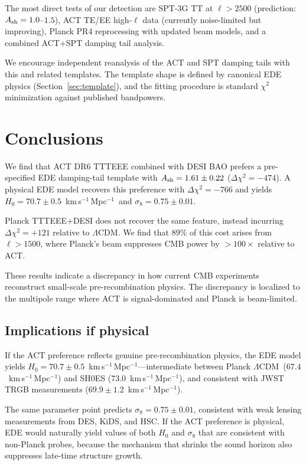 \documentclass[onecolumn,showpacs,preprintnumbers,amsmath,amssymb,prd]{revtex4-2}
\newcommand{\lcdm}{$\Lambda$CDM}
\newcommand{\kms}{km\,s$^{-1}$\,Mpc$^{-1}$}
\begin{document}
The most direct tests of our detection are SPT-3G TT at $\ell > 2500$ (prediction: $A_{\rm sh} = 1.0$--$1.5$), ACT TE/EE high-$\ell$ data (currently noise-limited but improving), Planck PR4 reprocessing with updated beam models, and a combined ACT+SPT damping tail analysis.

We encourage independent reanalysis of the ACT and SPT damping tails 
with this and related templates. The template shape is defined by 
canonical EDE physics (Section~\ref{sec:template}), and the fitting 
procedure is standard $\chi^2$ minimization against published bandpowers.

\section{Conclusions}
\label{sec:conclusions}

We find that ACT DR6 TTTEEE combined with DESI BAO prefers a pre-specified 
EDE damping-tail template with $A_{\rm sh} = 1.61 \pm 0.22$ 
($\Delta\chi^2 = -474$). A physical EDE model recovers this preference 
with $\Delta\chi^2 = -766$ and yields $H_0 = 70.7 \pm 0.5$~\kms\ and 
$\sigma_8 = 0.75 \pm 0.01$.

Planck TTTEEE+DESI does not recover the same feature, instead incurring 
$\Delta\chi^2 = +121$ relative to \lcdm. We find that 89\% of this cost 
arises from $\ell > 1500$, where Planck's beam suppresses CMB power by 
$>100\times$ relative to ACT.

These results indicate a discrepancy in how current CMB experiments 
reconstruct small-scale pre-recombination physics. The discrepancy 
is localized to the multipole range where ACT is signal-dominated 
and Planck is beam-limited.

\subsection{Implications if physical}

If the ACT preference reflects genuine pre-recombination physics, 
the EDE model yields $H_0 = 70.7 \pm 0.5$~\kms---intermediate between 
Planck \lcdm\ ($67.4$~\kms) and SH0ES ($73.0$~\kms), and consistent 
with JWST TRGB measurements ($69.9 \pm 1.2$~\kms).

The same parameter point predicts $\sigma_8 = 0.75 \pm 0.01$, consistent 
with weak lensing measurements from DES, KiDS, and HSC. If the ACT 
preference is physical, EDE would naturally yield values of both 
$H_0$ and $\sigma_8$ that are consistent with non-Planck probes, 
because the mechanism that shrinks the sound horizon also suppresses 
late-time structure growth.
\end{document}
